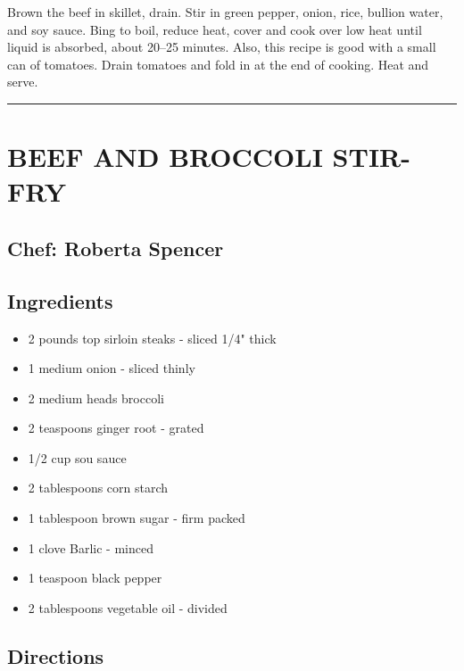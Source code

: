 \documentclass[
]{book}
\providecommand{\tightlist}{%
  \setlength{\itemsep}{0pt}\setlength{\parskip}{0pt}}
\begin{document}
Brown the beef in skillet, drain. Stir in green pepper, onion, rice, bullion water, and soy sauce. Bing to boil, reduce heat, cover and cook over low heat until liquid is absorbed, about 20--25 minutes. Also, this recipe is good with a small can of tomatoes. Drain tomatoes and fold in at the end of cooking. Heat and serve.

\begin{center}\rule{0.5\linewidth}{0.5pt}\end{center}

\hypertarget{beef-and-broccoli-stir-fry}{%
\section*{BEEF AND BROCCOLI STIR-FRY}\label{beef-and-broccoli-stir-fry}}


\hypertarget{chef-roberta-spencer-16}{%
\subsection*{Chef: Roberta Spencer}\label{chef-roberta-spencer-16}}


\hypertarget{ingredients-44}{%
\subsection*{Ingredients}\label{ingredients-44}}


\begin{itemize}
\tightlist
\item
  2 pounds top sirloin steaks - sliced 1/4" thick
\item
  1 medium onion - sliced thinly
\item
  2 medium heads broccoli
\item
  2 teaspoons ginger root - grated
\item
  1/2 cup sou sauce
\item
  2 tablespoons corn starch
\item
  1 tablespoon brown sugar - firm packed
\item
  1 clove Barlic - minced
\item
  1 teaspoon black pepper
\item
  2 tablespoons vegetable oil - divided
\end{itemize}

\hypertarget{directions-44}{%
\subsection*{Directions}\label{directions-44}}
\end{document}
